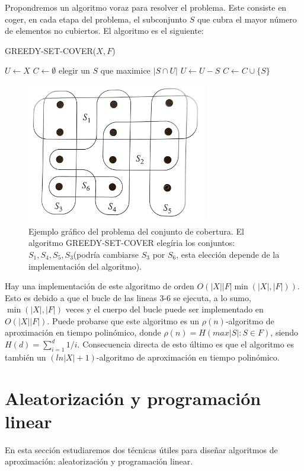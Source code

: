 \documentclass{article}
\begin{document}
Propondremos un algoritmo voraz para resolver el problema. Este consiste en coger, en cada etapa del problema, el subconjunto $S$ que cubra el mayor número de elementos no cubiertos. El algoritmo es el siguiente:\\

\begin{algorithm}[H]
\caption{GREEDY-SET-COVER($X,F$)}
\begin{algorithmic}[1]
\STATE $U \gets X$
\STATE $C \gets \emptyset$
\STATE elegir un $S$ que maximice $|S \cap U|$
\STATE $U \gets U - S$
\STATE $C \gets C \cup \{S\}$
\ENDWHILE
{}
\end{algorithmic}
\end{algorithm}

\begin{figure}[H]
  \centering
    \includegraphics[width=0.7\textwidth]{set-cover}
  \caption{Ejemplo gráfico del problema del conjunto de cobertura. El algoritmo GREEDY-SET-COVER elegíria los conjuntos: $S_1, S_4, S_5, S_3$(podría cambiarse $S_3$ por $S_6$, esta elección depende de la implementación del algoritmo).}
\end{figure}

Hay una implementación de este algoritmo de orden $O(|X||F|\min(|X|,|F|))$. Esto es debido a que el bucle de las lineas 3-6 se ejecuta, a lo sumo, $\min(|X|,|F|)$ veces y el cuerpo del bucle puede ser implementado en $O(|X||F|)$. Puede probarse que este algoritmo es un $\rho(n)$-algoritmo de aproximación en tiempo polinómico, donde $\rho(n) = H(max{|S|:S \in F})$, siendo $H(d) = \sum_{i=1}^{d}1/i$. Consecuencia directa de esto último es que el algoritmo es también un $(ln|X| + 1)$-algoritmo de aproximación en tiempo polinómico.

\section{Aleatorización y programación linear}
En esta sección estudiaremos dos técnicas útiles para diseñar algoritmos de aproximación: aleatorización y programación linear.
\end{document}
